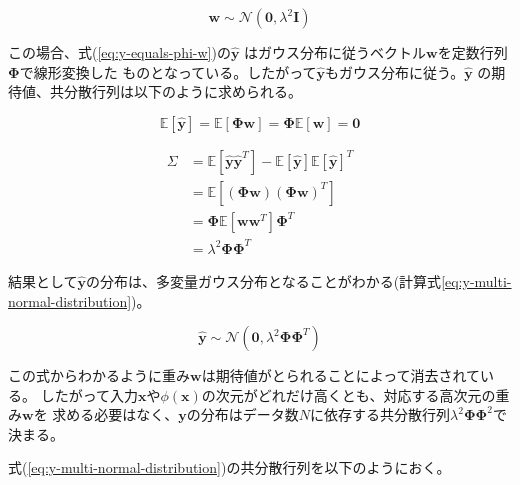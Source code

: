 \begin{equation}\label{eq:w-gausian-distribution}
\boldsymbol{w} \sim \mathcal{N}(\boldsymbol{0}, \lambda^2\boldsymbol{I})
\end{equation}

この場合、式(\ref{eq:y-equals-phi-w})の$\boldsymbol{\hat{y}}$
はガウス分布に従うベクトル$\boldsymbol{w}$を定数行列$\boldsymbol{\Phi}$で線形変換した
ものとなっている。したがって$\boldsymbol{\hat{y}}$もガウス分布に従う。$\boldsymbol{\hat{y}}$
の期待値、共分散行列は以下のように求められる。

\begin{equation}
\mathbb{E}[\boldsymbol{\hat{y}}] = \mathbb{E}[\boldsymbol{\Phi}\boldsymbol{w}] = \boldsymbol{\Phi}\mathbb{E}[\boldsymbol{w}] = \boldsymbol{0}
\end{equation}

\begin{equation}
\begin{split}
\Sigma &= \mathbb{E}[\boldsymbol{\hat{y}}\boldsymbol{\hat{y}}^T] - \mathbb{E}[\boldsymbol{\hat{y}}]\mathbb{E}[\boldsymbol{\hat{y}}]^T \\
	   &= \mathbb{E}[(\boldsymbol{\Phi}\boldsymbol{w})(\boldsymbol{\Phi}\boldsymbol{w})^T] \\
	   &= \boldsymbol{\Phi}\mathbb{E}[\boldsymbol{w}\boldsymbol{w}^T]\boldsymbol{\Phi}^T \\
	   &= \lambda^2\boldsymbol{\Phi}\boldsymbol{\Phi}^T
\end{split}
\end{equation}

結果として$\boldsymbol{\hat{y}}$の分布は、多変量ガウス分布となることがわかる(計算式\ref{eq:y-multi-normal-distribution})。

\begin{equation}\label{eq:y-multi-normal-distribution}
\boldsymbol{\hat{y}} \sim \mathcal{N}(\boldsymbol{0}, \lambda^2\boldsymbol{\Phi}\boldsymbol{\Phi}^T)
\end{equation}

この式からわかるように重み$\boldsymbol{w}$は期待値がとられることによって消去されている。
したがって入力$\boldsymbol{x}$や$\phi(\boldsymbol{x})$の次元がどれだけ高くとも、対応する高次元の重み$\boldsymbol{w}$を
求める必要はなく、$\boldsymbol{y}$の分布はデータ数$N$に依存する共分散行列$\lambda^2\boldsymbol{\Phi}\boldsymbol{\Phi}^2$で
決まる。

式(\ref{eq:y-multi-normal-distribution})の共分散行列を以下のようにおく。

